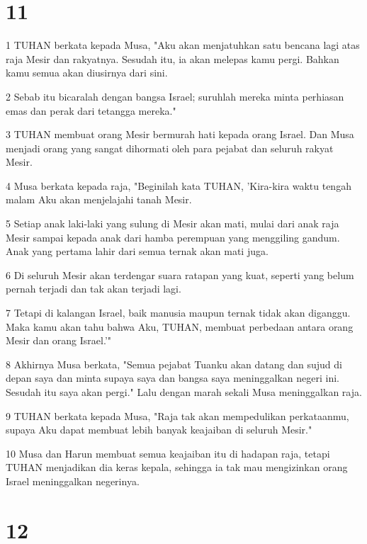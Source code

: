 \chapter{11}

\par 1 TUHAN berkata kepada Musa, "Aku akan menjatuhkan satu bencana lagi atas raja Mesir dan rakyatnya. Sesudah itu, ia akan melepas kamu pergi. Bahkan kamu semua akan diusirnya dari sini.
\par 2 Sebab itu bicaralah dengan bangsa Israel; suruhlah mereka minta perhiasan emas dan perak dari tetangga mereka."
\par 3 TUHAN membuat orang Mesir bermurah hati kepada orang Israel. Dan Musa menjadi orang yang sangat dihormati oleh para pejabat dan seluruh rakyat Mesir.
\par 4 Musa berkata kepada raja, "Beginilah kata TUHAN, 'Kira-kira waktu tengah malam Aku akan menjelajahi tanah Mesir.
\par 5 Setiap anak laki-laki yang sulung di Mesir akan mati, mulai dari anak raja Mesir sampai kepada anak dari hamba perempuan yang menggiling gandum. Anak yang pertama lahir dari semua ternak akan mati juga.
\par 6 Di seluruh Mesir akan terdengar suara ratapan yang kuat, seperti yang belum pernah terjadi dan tak akan terjadi lagi.
\par 7 Tetapi di kalangan Israel, baik manusia maupun ternak tidak akan diganggu. Maka kamu akan tahu bahwa Aku, TUHAN, membuat perbedaan antara orang Mesir dan orang Israel.'"
\par 8 Akhirnya Musa berkata, "Semua pejabat Tuanku akan datang dan sujud di depan saya dan minta supaya saya dan bangsa saya meninggalkan negeri ini. Sesudah itu saya akan pergi." Lalu dengan marah sekali Musa meninggalkan raja.
\par 9 TUHAN berkata kepada Musa, "Raja tak akan mempedulikan perkataanmu, supaya Aku dapat membuat lebih banyak keajaiban di seluruh Mesir."
\par 10 Musa dan Harun membuat semua keajaiban itu di hadapan raja, tetapi TUHAN menjadikan dia keras kepala, sehingga ia tak mau mengizinkan orang Israel meninggalkan negerinya.

\chapter{12}

